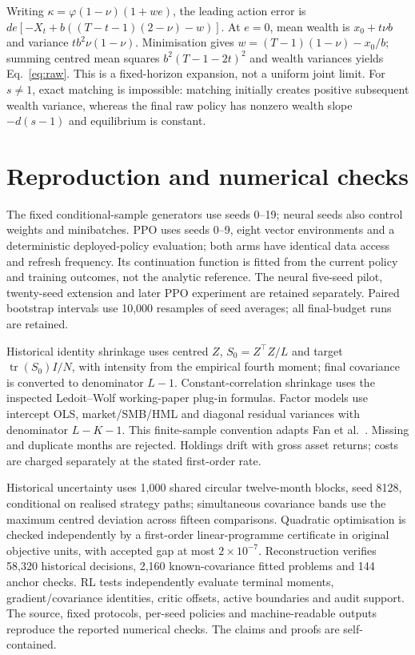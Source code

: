 \documentclass[sigconf,anonymous,review]{acmart}
\begin{document}
Writing $\kappa=\varphi(1-\nu)(1+we)$, the leading action error is $de[-X_t+b((T-t-1)(2-\nu)-w)]$. At $e=0$, mean wealth is $x_0+t\nu b $ and variance $tb^2\nu(1-\nu)$. Minimisation gives $w=(T-1)(1-\nu)-x_0/b $; summing centred mean squares $b^2(T-1-2t)^2$ and wealth variances yields Eq.~\eqref{eq:raw}. This is a fixed-horizon expansion, not a uniform joint limit. For $s\ne1$, exact matching is impossible: matching initially creates positive subsequent wealth variance, whereas the final raw policy has nonzero wealth slope $-d(s-1)$ and equilibrium is constant.

\section{Reproduction and numerical checks}\label{app:repro}
The fixed conditional-sample generators use seeds 0--19; neural seeds also control weights and minibatches. PPO uses seeds 0--9, eight vector environments and a deterministic deployed-policy evaluation; both arms have identical data access and refresh frequency. Its continuation function is fitted from the current policy and training outcomes, not the analytic reference. The neural five-seed pilot, twenty-seed extension and later PPO experiment are retained separately. Paired bootstrap intervals use 10,000 resamples of seed averages; all final-budget runs are retained.

Historical identity shrinkage uses centred $Z $, $S_0=Z^\top Z/L $ and target $\operatorname{tr}(S_0)I/N $, with intensity from the empirical fourth moment; final covariance is converted to denominator $L-1$. Constant-correlation shrinkage uses the inspected Ledoit--Wolf working-paper plug-in formulas. Factor models use intercept OLS, market/SMB/HML and diagonal residual variances with denominator $L-K-1$. This finite-sample convention adapts Fan et al.~\cite{fan2008}. Missing and duplicate months are rejected. Holdings drift with gross asset returns; costs are charged separately at the stated first-order rate.

Historical uncertainty uses 1,000 shared circular twelve-month blocks, seed 8128, conditional on realised strategy paths; simultaneous covariance bands use the maximum centred deviation across fifteen comparisons. Quadratic optimisation is checked independently by a first-order linear-programme certificate in original objective units, with accepted gap at most $2\times10^{-7}$. Reconstruction verifies 58,320 historical decisions, 2,160 known-covariance fitted problems and 144 anchor checks. RL tests independently evaluate terminal moments, gradient/covariance identities, critic offsets, active boundaries and audit support. The source, fixed protocols, per-seed policies and machine-readable outputs reproduce the reported numerical checks. The claims and proofs are self-contained.
\end{document}
